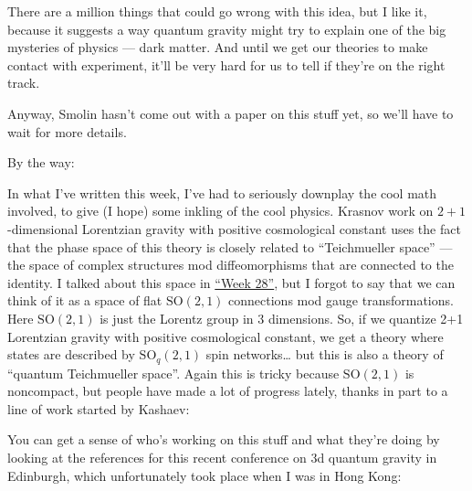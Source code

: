 \documentclass{article}
\renewcommand{\texttt}[1]{%
  \begingroup
  \ttfamily
  \begingroup\lccode`~=`/\lowercase{\endgroup\def~}{/\discretionary{}{}{}}%
  \begingroup\lccode`~=`[\lowercase{\endgroup\def~}{[\discretionary{}{}{}}%
  \begingroup\lccode`~=`.\lowercase{\endgroup\def~}{.\discretionary{}{}{}}%
  \catcode`/=\active\catcode`[=\active\catcode`.=\active
  \scantokens{#1\noexpand}%
  \endgroup
}
\begin{document}
There are a million things that could go wrong with this idea, but I
like it, because it suggests a way quantum gravity might try to explain
one of the big mysteries of physics --- dark matter. And until we get
our theories to make contact with experiment, it'll be very hard for us
to tell if they're on the right track.

Anyway, Smolin hasn't come out with a paper on this stuff yet, so we'll
have to wait for more details.

By the way:

In what I've written this week, I've had to seriously downplay the cool
math involved, to give (I hope) some inkling of the cool physics.
Krasnov work on \(2+1\)-dimensional Lorentzian gravity with positive
cosmological constant uses the fact that the phase space of this theory
is closely related to ``Teichmueller space'' --- the space of complex
structures mod diffeomorphisms that are connected to the identity. I
talked about this space in \protect\hyperlink{week28}{``Week 28''}, but
I forgot to say that we can think of it as a space of flat
\(\mathrm{SO}(2,1)\) connections mod gauge transformations. Here
\(\mathrm{SO}(2,1)\) is just the Lorentz group in 3 dimensions. So, if
we quantize 2+1 Lorentzian gravity with positive cosmological constant,
we get a theory where states are described by \(\mathrm{SO}_q(2,1)\)
spin networks\ldots{} but this is also a theory of ``quantum
Teichmueller space''. Again this is tricky because \(\mathrm{SO}(2,1)\)
is noncompact, but people have made a lot of progress lately, thanks in
part to a line of work started by Kashaev:


You can get a sense of who's working on this stuff and what they're
doing by looking at the references for this recent conference on 3d
quantum gravity in Edinburgh, which unfortunately took place when I was
in Hong Kong:
\end{document}
